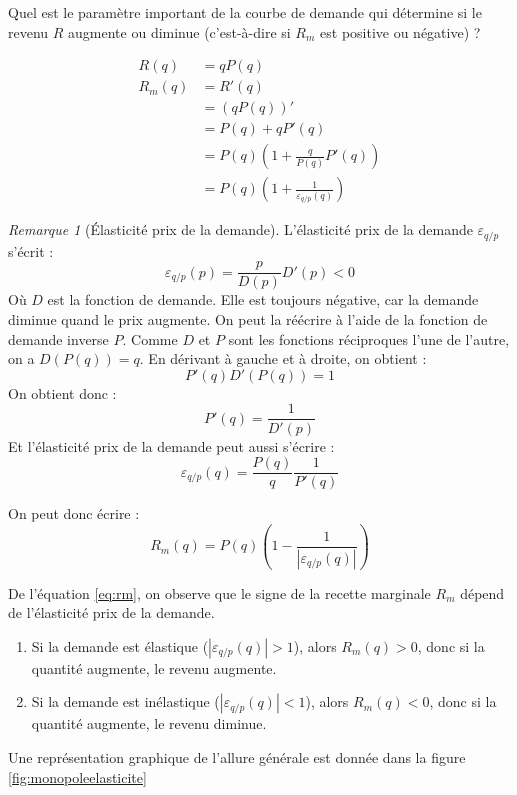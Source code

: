 \documentclass[
]{book}
\providecommand{\tightlist}{%
  \setlength{\itemsep}{0pt}\setlength{\parskip}{0pt}}
\theoremstyle{definition}
\theoremstyle{definition}
\theoremstyle{definition}
\theoremstyle{definition}
\theoremstyle{remark}
\newtheorem*{remark}{Remarque}
\begin{document}
Quel est le paramètre important de la courbe de demande qui détermine si le revenu \(R\) augmente ou diminue (c'est-à-dire si \(R_m\) est positive ou négative) ?

\begin{align*}
R(q) & = qP(q)\\
R_m(q)& = R'(q) \\
& = \left(qP(q)\right)' \\
& = P(q) + qP'(q) \\
& = P(q)\left(1 + \frac{q}{P(q)}P'(q) \right)\\
& = P(q)\left(1 + \frac{1}{\varepsilon_{q/p}(q)}\right)
\end{align*}

\begin{remark}[Élasticité prix de la demande]
L'élasticité prix de la demande \(\varepsilon_{q/p}\) s'écrit :
\[\varepsilon_{q/p}(p)=\frac{p}{D(p)}D'(p) <0\]
Où \(D\) est la fonction de demande.
Elle est toujours négative, car la demande diminue quand le prix augmente.
On peut la réécrire à l'aide de la fonction de demande inverse \(P\).
Comme \(D\) et \(P\) sont les fonctions réciproques l'une de l'autre, on a \(D(P(q)) = q\).
En dérivant à gauche et à droite, on obtient :
\[P'(q)D'(P(q)) = 1\]
On obtient donc :
\[P'(q)=\frac{1}{D'(p)}\]
Et l'élasticité prix de la demande peut aussi s'écrire :
\[\varepsilon_{q/p}(q)=\frac{P(q)}{q}\frac{1}{P'(q)}\]
\end{remark}

On peut donc écrire :
\begin{equation}
R_m(q) = P(q)\left(1 - \frac{1}{|\varepsilon_{q/p}(q)|}\right)
\label{eq:rm}
\end{equation}

De l'équation \eqref{eq:rm}, on observe que le signe de la recette marginale \(R_m\) dépend de l'élasticité prix de la demande.

\begin{enumerate}
\def\labelenumi{\arabic{enumi}.}
\tightlist
\item
  Si la demande est élastique (\(|\varepsilon_{q/p}(q)|>1\)), alors \(R_m(q)>0\), donc si la quantité augmente, le revenu augmente.
\item
  Si la demande est inélastique (\(|\varepsilon_{q/p}(q)|<1\)), alors \(R_m(q)<0\), donc si la quantité augmente, le revenu diminue.
\end{enumerate}

Une représentation graphique de l'allure générale est donnée dans la figure \ref{fig:monopoleelasticite}
\end{document}
